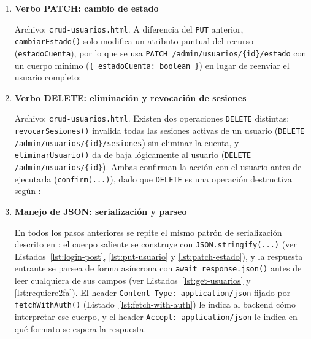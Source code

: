 \documentclass[12pt,a4paper]{article}
\begin{document}
\begin{enumerate}
    \item \textbf{Verbo PATCH: cambio de estado}\label{step:patch}

    \begin{sloppypar}
    Archivo: \texttt{crud-usuarios.html}. A diferencia del \texttt{PUT} anterior, \texttt{cambiarEstado()} solo modifica un atributo puntual del recurso (\texttt{estadoCuenta}), por lo que se usa \texttt{PATCH /admin/usuarios/\{id\}/estado} con un cuerpo mínimo (\texttt{\{ estadoCuenta: boolean \}}) en lugar de reenviar el usuario completo:
    \end{sloppypar}

    

    \item \textbf{Verbo DELETE: eliminación y revocación de sesiones}\label{step:delete}

    Archivo: \texttt{crud-usuarios.html}. Existen dos operaciones \texttt{DELETE} distintas: \texttt{revocarSesiones()} invalida todas las sesiones activas de un usuario (\texttt{DELETE /admin/usuarios/\{id\}/sesiones}) sin eliminar la cuenta, y \texttt{eliminarUsuario()} da de baja lógicamente al usuario (\texttt{DELETE /admin/usuarios/\{id\}}). Ambas confirman la acción con el usuario antes de ejecutarla (\texttt{confirm(...)}), dado que \texttt{DELETE} es una operación destructiva según \cite{rfc9110}:

    

    \item \textbf{Manejo de JSON: serialización y parseo}\label{step:json}

    \begin{sloppypar}
    En todos los pasos anteriores se repite el mismo patrón de serialización descrito en \cite{rfc8259}: el cuerpo saliente se construye con \texttt{JSON.stringify(...)} (ver Listados~\ref{lst:login-post}, \ref{lst:put-usuario} y \ref{lst:patch-estado}), y la respuesta entrante se parsea de forma asíncrona con \texttt{await response.json()} antes de leer cualquiera de sus campos (ver Listados~\ref{lst:get-usuarios} y \ref{lst:requiere2fa}). El header \texttt{Content-Type: application/json} fijado por \texttt{fetchWithAuth()} (Listado~\ref{lst:fetch-with-auth}) le indica al backend cómo interpretar ese cuerpo, y el header \texttt{Accept: application/json} le indica en qué formato se espera la respuesta.
    \end{sloppypar}


\end{enumerate}
\end{document}

